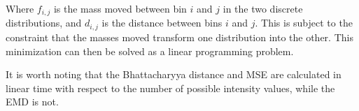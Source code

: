 Where $f_{i, j}$ is the mass moved between bin $i$ and $j$ in the two discrete distributions, and $d_{i, j}$ is the distance between bins $i$ and $j$.
This is subject to the constraint that the masses moved transform one distribution into the other.
This minimization can then be solved as a linear programming problem.



It is worth noting that the Bhattacharyya distance and MSE are calculated in linear time with respect to the number of possible intensity values, while the EMD is not.









